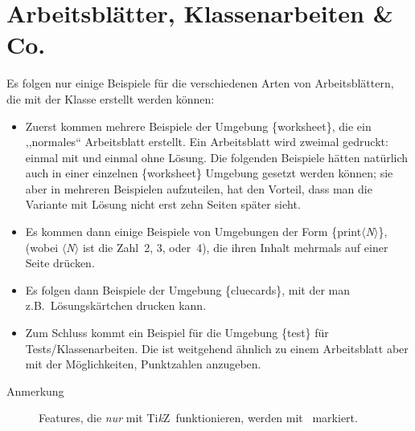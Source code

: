 \documentclass[hyperworksheet]{drcschool}
\makeatletter
\newcommand*{\env}[1]{\textup{\ttfamily\{#1\}}}                            %
\newcommand*{\param}[1]{\mbox{\normalfont$\langle$\textit{#1}$\rangle$}}   %
\newcommand*{\TikZ}{\textup{Ti\textit{k}Z}}                                %
\newcommand*{\onlytikz}{%
   \textcolor{red}{%
      \vtop{%
         \vbox{%
            \vss                                                           %
            \hrule height\p@                                               %
            \kern2\p@                                                      %
            \hbox{\normalfont\normalsize! \TikZ\ !}%
         }%
         \kern2\p@                                                         %
         \hrule height\p@                                                  %
      }%
   }%
}                                                                          %
\makeatother
\begin{document}
\section{Arbeitsblätter, Klassenarbeiten \& Co.}
Es folgen nur einige Beispiele für die verschiedenen Arten von Arbeitsblättern, die mit
der Klasse erstellt werden können:
\begin{itemize}
\item Zuerst kommen mehrere Beispiele der Umgebung \env{worksheet}, die ein ,,normales``
      Arbeitsblatt erstellt. Ein Arbeitsblatt wird zweimal gedruckt: einmal mit und
      einmal ohne Lösung. Die folgenden Beispiele hätten natürlich auch in einer
      einzelnen \env{worksheet} Umgebung gesetzt werden können; sie aber in mehreren
      Beispielen aufzuteilen, hat den Vorteil, dass man die Variante mit Lösung nicht
      erst zehn Seiten später sieht.
\item Es kommen dann einige Beispiele von Umgebungen der Form \env{print\param{N}},
      (wobei \param{N} ist die Zahl~2, 3, oder~4), die ihren Inhalt mehrmals auf einer
      Seite drücken.
\item Es folgen dann Beispiele der Umgebung \env{cluecards}, mit der man z.B.~Lösungskärtchen drucken kann.
\item Zum Schluss kommt ein Beispiel für die Umgebung \env{test} für Tests/Klassenarbeiten.
      Die ist weitgehend ähnlich zu einem Arbeitsblatt aber mit der Möglichkeiten,
      Punktzahlen anzugeben.
\end{itemize}

\begin{description}
\item[Anmerkung] Features, die \emph{nur} mit \TikZ\ funktionieren, werden mit
\onlytikz\ markiert.
\end{description}
\end{document}
